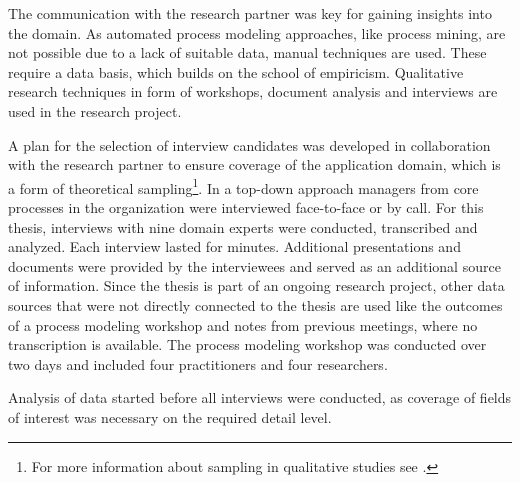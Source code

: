 	The communication with the research partner was key for gaining insights into the domain. As automated process modeling approaches, like process mining, are not possible due to a lack of suitable data, manual techniques are used. These require a data basis, which builds on the school of empiricism. Qualitative research techniques in form of workshops, document analysis and interviews are used in the research project. 
	
	A plan for the selection of interview candidates was developed in collaboration with the research partner to ensure coverage of the application domain, which is a form of theoretical sampling\footnote{For more information about sampling in qualitative studies see \citep{coyne1997sampling}.}. In a top-down approach managers from core processes in the organization were interviewed face-to-face or by call. For this thesis, interviews with nine domain experts were conducted, transcribed and analyzed. Each interview lasted for  minutes. Additional presentations and documents were provided by the interviewees and served as an additional source of information. Since the thesis is part of an ongoing research project, other data sources that were not directly connected to the thesis are used like the outcomes of a process modeling workshop and notes from previous meetings, where no transcription is available. The process modeling workshop was conducted over two days and included four practitioners and four researchers. 
	
	Analysis of data started before all interviews were conducted, as coverage of fields of interest was necessary on the required detail level. 
	
	
	
